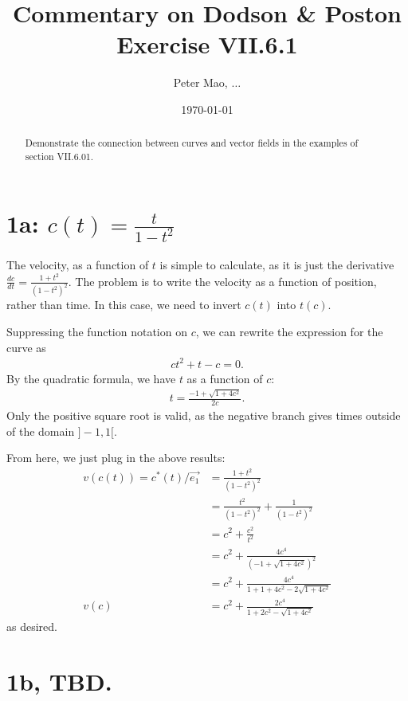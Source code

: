 \documentclass[11pt]{article}
\title{Commentary on Dodson \& Poston Exercise VII.6.1}
\author{Peter Mao, $\ldots$}
\date{\today}
\begin{document}
\maketitle
\pagestyle{empty}

\begin{abstract}
  Demonstrate the connection between curves and vector fields in the examples of
  section VII.6.01.
\end{abstract}

\section{1a: $c(t) = \frac{t}{1 - t^2}$}

The velocity, as a function of $t$ is simple to calculate, as it is just the
derivative $\frac{dc}{dt} = \frac{1 + t^2}{(1 - t^2)^2}$.  The problem is to
write the velocity as a function of position, rather than time.  In this case,
we need to invert $c(t)$ into $t(c)$.

Suppressing the function notation on $c$, we can rewrite the expression for the
curve as
\begin{align}
  ct^2 + t - c = 0.
\end{align}
By the quadratic formula, we have $t$ as a function of $c$:
\begin{align}
  t = \frac{-1 + \sqrt{1 + 4c^2}}{2c}.
\end{align}
Only the positive square root is valid, as the negative branch gives times
outside of the domain $]-1,1[$.

    From here, we just plug in the above results:
    \begin{align}
      v(c(t)) = c^*(t)/\vec{e_1} &=  \frac{1 + t^2}{(1 - t^2)^2} \\
      &=  \frac{t^2}{(1 - t^2)^2} +  \frac{1}{(1 - t^2)^2} \\
      &=  c^2 + \frac{c^2}{t^2} \\
      &=  c^2 + \frac{4c^4}{(-1 + \sqrt{1 + 4c^2})^2} \\
      &=  c^2 + \frac{4c^4}{1 + 1 + 4c^2 - 2\sqrt{1 + 4c^2}} \\
    v(c)  &=  c^2 + \frac{2c^4}{1 + 2c^2 - \sqrt{1 + 4c^2}} 
    \end{align}
    as desired.
    
\section{1b, TBD.}
\end{document}
